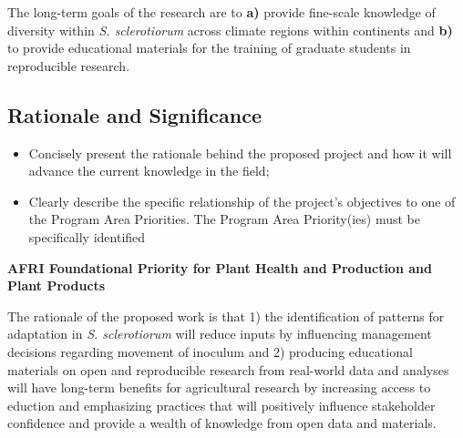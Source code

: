 \documentclass[12pt,letterpaper]{article}
\begin{document}
The long-term goals of the research are to \textbf{a)} provide fine-scale knowledge of diversity within \textit{S. sclerotiorum} across climate regions within continents and \textbf{b)} to provide educational materials for the training of graduate students in reproducible research. 

\subsection{Rationale and Significance}


\begin{itemize}
  \item Concisely present the rationale behind the proposed project and how it will
  advance the current knowledge in the field;

  \item Clearly describe the specific relationship of the project's objectives to
  one of the Program Area Priorities. The Program Area Priority(ies) must be
  specifically identified
\end{itemize}



\textbf{AFRI Foundational Priority for Plant Health and Production and Plant Products}

The rationale of the proposed work is that 1) the identification of patterns for adaptation in \textit{S. sclerotiorum} will reduce inputs by influencing management decisions regarding movement of inoculum and 2) producing educational materials on open and reproducible research from real-world data and analyses will have long-term benefits for agricultural research by increasing access to eduction and emphasizing practices that will positively influence stakeholder confidence and provide a wealth of knowledge from open data and materials. 
\end{document}
